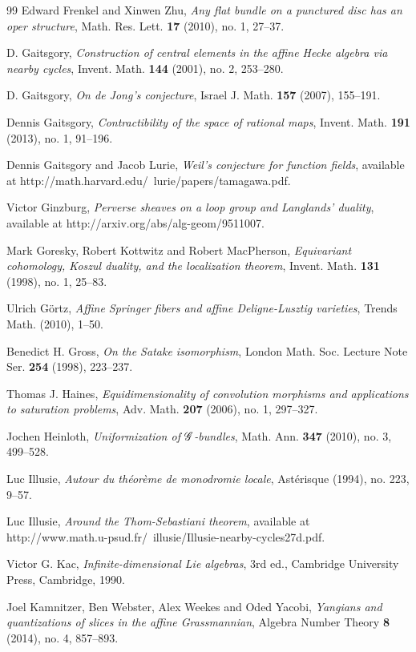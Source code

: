 \begin{thebibliography}{99}
 Edward Frenkel and Xinwen Zhu, \emph{Any flat bundle on a punctured disc has an oper structure}, Math. Res. Lett. \textbf{17} (2010), no. 1, 27--37.

 D. Gaitsgory, \emph{Construction of central elements in the affine Hecke algebra via nearby cycles}, Invent. Math. \textbf{144} (2001), no. 2, 253--280.

 D. Gaitsgory, \emph{On de Jong's conjecture}, Israel J. Math. \textbf{157} (2007), 155--191.

 Dennis Gaitsgory, \emph{Contractibility of the space of rational maps}, Invent. Math. \textbf{191} (2013), no. 1, 91--196.

 Dennis Gaitsgory and Jacob Lurie, \emph{Weil's conjecture for function fields}, available at http://math.harvard.edu/~lurie/papers/tamagawa.pdf.

 Victor Ginzburg, \emph{Perverse sheaves on a loop group and Langlands' duality}, available at http://arxiv.org/abs/alg-geom/9511007.

 Mark Goresky, Robert Kottwitz and Robert MacPherson, \emph{Equivariant cohomology, Koszul duality, and the localization theorem}, Invent. Math. \textbf{131} (1998), no. 1, 25--83.

 Ulrich G{\"o}rtz, \emph{Affine Springer fibers and affine Deligne-Lusztig varieties}, Trends Math. (2010), 1--50.

 Benedict H. Gross, \emph{On the Satake isomorphism}, London Math. Soc. Lecture Note Ser. \textbf{254} (1998), 223--237.

 Thomas J. Haines, \emph{Equidimensionality of convolution morphisms and applications to saturation problems}, Adv. Math. \textbf{207} (2006), no. 1, 297--327.

 Jochen Heinloth, \emph{Uniformization of $\mathscr{G}$-bundles}, Math. Ann. \textbf{347} (2010), no. 3, 499--528.

 Luc Illusie, \emph{Autour du th\'eor\`eme de monodromie locale}, Ast\'erisque (1994), no. 223, 9--57.

 Luc Illusie, \emph{Around the Thom-Sebastiani theorem}, available at http://www.math.u-psud.fr/~illusie/Illusie-nearby-cycles27d.pdf.

 Victor G. Kac, \emph{Infinite-dimensional Lie algebras}, 3rd ed., Cambridge University Press, Cambridge, 1990.

 Joel Kamnitzer, Ben Webster, Alex Weekes and Oded Yacobi, \emph{Yangians and quantizations of slices in the affine Grassmannian}, Algebra Number Theory \textbf{8} (2014), no. 4, 857--893.


\end{thebibliography}
